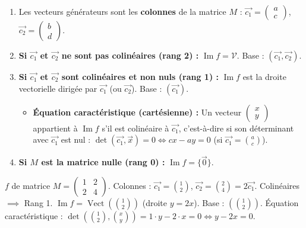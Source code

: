 \documentclass[11pt]{article}
\begin{document}
\begin{methode}
\begin{enumerate}
  \item Les vecteurs générateurs sont les \textbf{colonnes} de la matrice $M$ : $\vec{c_1} = \begin{pmatrix} a \\ c \end{pmatrix}$, $\vec{c_2} = \begin{pmatrix} b \\ d \end{pmatrix}$.
  \item \textbf{Si $\vec{c_1}$ et $\vec{c_2}$ ne sont pas colinéaires (rang 2) :} $\operatorname{Im} f = \mathcal{V}$. Base : $(\vec{c_1}, \vec{c_2})$.
  \item \textbf{Si $\vec{c_1}$ et $\vec{c_2}$ sont colinéaires et non nuls (rang 1) :} $\operatorname{Im} f$ est la droite vectorielle dirigée par $\vec{c_1}$ (ou $\vec{c_2}$). Base : $(\vec{c_1})$.
    \begin{itemize}
      \item \textbf{Équation caractéristique (cartésienne) :} Un vecteur $\begin{pmatrix} x \\ y \end{pmatrix}$ appartient à $\operatorname{Im} f$ s'il est colinéaire à $\vec{c_1}$, c'est-à-dire si son déterminant avec $\vec{c_1}$ est nul : $\det(\vec{c_1}, \vec{x}) = 0 \iff cx - ay = 0$ (si $\vec{c_1} = \binom{a}{c}$).
    \end{itemize}
  \item \textbf{Si $M$ est la matrice nulle (rang 0) :} $\operatorname{Im} f = \{\vec{0}\}$.
\end{enumerate}
\end{methode}

\begin{exemplebox}
$f$ de matrice $M = \begin{pmatrix} 1 & 2 \\ 2 & 4 \end{pmatrix}$.
\tcblower
Colonnes : $\vec{c_1} = \binom{1}{2}$, $\vec{c_2} = \binom{2}{4} = 2\vec{c_1}$. Colinéaires $\implies$ Rang 1.
$\operatorname{Im} f = \operatorname{Vect}(\binom{1}{2})$ (droite $y=2x$).
Base : $\left( \binom{1}{2} \right)$.
Équation caractéristique : $\det\left( \binom{1}{2}, \binom{x}{y} \right) = 1\cdot y - 2\cdot x = 0 \iff y - 2x = 0$.
\end{exemplebox}
\end{document}
